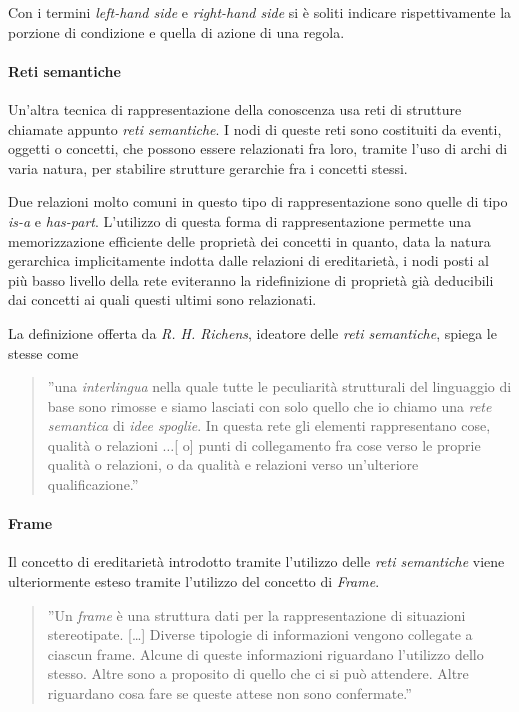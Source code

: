 Con i termini \emph{left-hand side} e \emph{right-hand side} si è soliti indicare rispettivamente la porzione di condizione e quella di azione di una regola.

\paragraph{Reti semantiche}
Un'altra tecnica di rappresentazione della conoscenza usa reti di strutture chiamate appunto \emph{reti semantiche}. I nodi di queste reti sono costituiti da eventi, oggetti o concetti, che possono essere relazionati fra loro, tramite l'uso di archi di varia natura, per stabilire strutture gerarchie fra i concetti stessi. \cite{development1993}

Due relazioni molto comuni in questo tipo di rappresentazione sono quelle di tipo \emph{is-a} e \emph{has-part}. L'utilizzo di questa forma di rappresentazione permette una memorizzazione efficiente delle proprietà dei concetti in quanto, data la natura gerarchica implicitamente indotta dalle relazioni di ereditarietà, i nodi posti al più basso livello della rete eviteranno la ridefinizione di proprietà già deducibili dai concetti ai quali questi ultimi sono relazionati.

La definizione offerta da \emph{R. H. Richens}, ideatore delle \emph{reti semantiche}, spiega le stesse come
\begin{quote}
''una \emph{interlingua} nella quale tutte le peculiarità strutturali del linguaggio di base sono rimosse e siamo lasciati con solo quello che io chiamo una \emph{rete semantica} di \emph{idee spoglie}. In questa rete gli elementi rappresentano cose, qualità o relazioni $\dots$[ o] punti di collegamento fra cose verso le proprie qualità o relazioni, o da qualità e relazioni verso un'ulteriore qualificazione.'' \cite{richens1956}
\end{quote}

\paragraph{Frame}
Il concetto di ereditarietà introdotto tramite l'utilizzo delle \emph{reti semantiche} viene ulteriormente esteso tramite l'utilizzo del concetto di \emph{Frame}. 
\begin{quote}
''Un \emph{frame} è una struttura dati per la rappresentazione di situazioni stereotipate. [\dots] Diverse tipologie di informazioni vengono collegate a ciascun frame. Alcune di queste informazioni riguardano l'utilizzo dello stesso. Altre sono a proposito di quello che ci si può attendere. Altre riguardano cosa fare se queste attese non sono confermate.'' \cite{minsky1974}
\end{quote}

